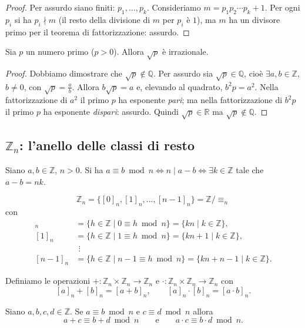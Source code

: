 \documentclass[11pt,a4paper]{article}
\begin{document}
\begin{proof}
Per assurdo siano finiti: $p_1, \dots, p_k$. Consideriamo $m = p_1 p_2 \cdots p_k + 1$. Per ogni $p_i$ si ha $p_i \nmid m$ (il resto della divisione di $m$ per $p_i$ è $1$), ma $m$ ha un divisore primo per il teorema di fattorizzazione: assurdo.
\end{proof}

\begin{proposizione}
Sia $p$ un numero primo ($p > 0$). Allora $\sqrt{p}$ è irrazionale.
\end{proposizione}

\begin{proof}
Dobbiamo dimostrare che $\sqrt{p} \notin \mathbb{Q}$. Per assurdo sia $\sqrt{p} \in \mathbb{Q}$, cioè $\exists a, b \in \mathbb{Z}$, $b \neq 0$, con $\sqrt{p} = \frac{a}{b}$. Allora $b\sqrt{p} = a$ e, elevando al quadrato, $b^2 p = a^2$. Nella fattorizzazione di $a^2$ il primo $p$ ha esponente \emph{pari}; ma nella fattorizzazione di $b^2 p$ il primo $p$ ha esponente \emph{dispari}: assurdo. Quindi $\sqrt{p} \in \mathbb{R}$ ma $\sqrt{p} \notin \mathbb{Q}$.
\end{proof}

\subsection{$\mathbb{Z}_n$: l'anello delle classi di resto}

Siano $a, b \in \mathbb{Z}$, $n > 0$. Si ha $a \equiv b \bmod n \iff n \mid a - b \iff \exists k \in \mathbb{Z}$ tale che $a - b = nk$.

\[
  \mathbb{Z}_n = \{[0]_n, [1]_n, \dots, [n-1]_n\} = \mathbb{Z}/{\equiv_n}
\]
con
\begin{align*}
  [0]_n &= \{h \in \mathbb{Z} \mid 0 \equiv h \bmod n\} = \{kn \mid k \in \mathbb{Z}\},\\
  [1]_n &= \{h \in \mathbb{Z} \mid 1 \equiv h \bmod n\} = \{kn + 1 \mid k \in \mathbb{Z}\},\\
  &\ \,\vdots\\
  [n-1]_n &= \{h \in \mathbb{Z} \mid n-1 \equiv h \bmod n\} = \{kn + n - 1 \mid k \in \mathbb{Z}\}.
\end{align*}

Definiamo le operazioni $+ : \mathbb{Z}_n\times\mathbb{Z}_n \to \mathbb{Z}_n$ e $\cdot : \mathbb{Z}_n\times\mathbb{Z}_n \to \mathbb{Z}_n$ con
\[
  [a]_n + [b]_n = [a + b]_n, \qquad [a]_n\cdot[b]_n = [a\cdot b]_n .
\]

\begin{proposizione}[Lemma]
Siano $a, b, c, d \in \mathbb{Z}$. Se $a \equiv b \bmod n$ e $c \equiv d \bmod n$ allora
\[
  a + c \equiv b + d \bmod n \qquad\text{e}\qquad a\cdot c \equiv b\cdot d \bmod n .
\]
\end{proposizione}
\end{document}

